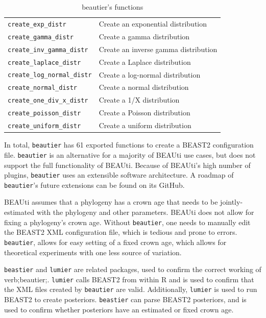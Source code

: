 \documentclass{article}
\begin{document}
\begin{table}[]
\begin{tabular}{ | l | l | }
\verb;create_exp_distr; & Create an exponential distribution \\
\verb;create_gamma_distr; & Create a gamma distribution \\
\verb;create_inv_gamma_distr; & Create an inverse gamma distribution \\
\verb;create_laplace_distr; & Create a Laplace distribution \\
\verb;create_log_normal_distr; & Create a log-normal distribution \\
\verb;create_normal_distr; & Create a normal distribution \\
\verb;create_one_div_x_distr; & Create a 1/X distribution \\
\verb;create_poisson_distr; & Create a Poisson distribution \\
\verb;create_uniform_distr; & Create a uniform distribution \\
\hline
\end{tabular}
\caption{beautier's functions}
\label{tab:functions}
\end{table}

In total, \verb;beautier; has 61 exported functions to create a BEAST2 configuration file. 
\verb;beautier; is an alternative for a majority of BEAUti use cases, 
but does not support the full functionality of BEAUti. 
Because of BEAUti's high number of plugins, \verb;beautier; uses an extensible software architecture.
A roadmap of \verb;beautier;'s future extensions can be found on its GitHub.

BEAUti assumes that a phylogeny has a crown age that needs to be jointly-estimated
with the phylogeny and other parameters. BEAUti does not allow for fixing
a phylogeny's crown age. Without \verb;beautier;, one needs to manually edit the BEAST2 
XML configuration file, which is tedious and prone to errors. 
\verb;beautier;, allows for easy setting of a fixed crown age, which allows for theoretical experiments with one less source of variation. 

\verb;beastier; \cite{beastier} and \verb;lumier; \cite{lumier} are related packages, used to confirm the correct working of verb;beautier;.
\verb;lumier; calls BEAST2 from within R and is used to confirm that the XML files created by \verb;beautier; are valid. 
Additionally, \verb;lumier; is used to run BEAST2 to create posteriors. 
\verb;beastier; can parse BEAST2 posteriors, and is used to confirm whether posteriors have an estimated or fixed crown age.

\end{document}
